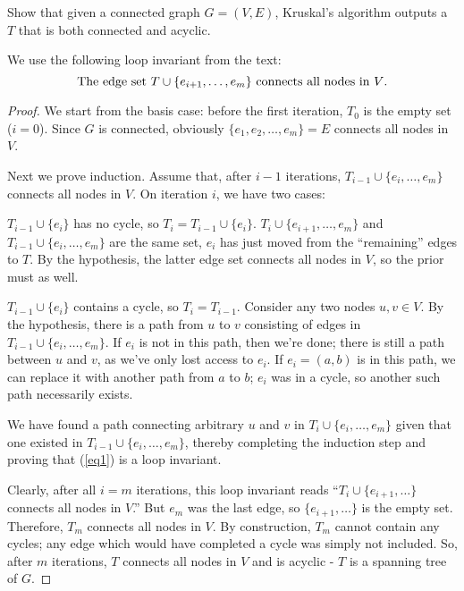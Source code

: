 \documentclass{article}
\newenvironment{prb}[1]
	{\renewcommand\theinner{#1}\inner}
	{\endinner}
\begin{document}
\begin{prb}{2.8}
	Show that given a connected graph $G=(V,E)$, Kruskal's algorithm outputs a
	$T$ that is both connected and acyclic.
\end{prb}

\break
We use the following loop invariant from the text:
\begin{equation}\label{eq1}
\textit{\emph{The edge set $T\cup\{e_{i+1},\ldots,e_m\}$ connects all
nodes in $V$.}}
\end{equation}

\begin{proof}
We start from the basis case: before the first iteration, $T_0$ is
the empty set ($i=0$). Since $G$ is connected, obviously 
$\{e_1,e_2,\ldots,e_m\}=E$ connects all nodes in $V$.

Next we prove induction. Assume that, after $i-1$ iterations,
$T_{i-1}\cup\{e_i,\ldots,e_m\}$ connects all nodes in $V$. On iteration
$i$, we have two cases:

 $T_{i-1}\cup\{e_i\}$ has no cycle, so 
$T_i=T_{i-1}\cup\{e_i\}$. $T_i\cup\{e_{i+1},\ldots,e_m\}$ and 
$T_{i-1}\cup\{e_i,\ldots,e_m\}$ are the same set, $e_i$ has just
moved from the ``remaining'' edges to $T$. By the hypothesis, the 
latter edge set connects all nodes in $V$, so the prior must as well.

 $T_{i-1}\cup\{e_i\}$ contains a cycle, so
$T_i=T_{i-1}$. Consider any two nodes $u,v\in V$. By the hypothesis,
there is a path from $u$ to $v$ consisting of edges in 
$T_{i-1}\cup\{e_i,\ldots,e_m\}$. If $e_i$ is not in this path,
then we're done; there is still a path between $u$ and $v$, as 
we've only lost access to $e_i$. If $e_i=(a,b)$ is in this path, we
can replace it with another path from $a$ to $b$; $e_i$ was in a cycle,
so another such path necessarily exists. 

We have found a path connecting arbitrary $u$ and $v$ in 
$T_i\cup\{e_i,\ldots,e_m\}$ given that one existed in 
$T_{i-1}\cup\{e_i,\ldots,e_m\}$, thereby completing the induction step
and proving that (\ref{eq1}) is a loop invariant.

Clearly, after all $i=m$ iterations, this loop invariant reads
``$T_i\cup\{e_{i+1},\ldots\}$ connects all nodes in $V$.'' But
$e_m$ was the last edge, so $\{e_{i+1},\ldots\}$ is the empty set.
Therefore, $T_m$ connects all nodes in $V$. By construction, 
$T_m$ cannot contain any cycles; any edge which would
have completed a cycle was simply not included. So, after $m$ iterations,
$T$ connects all nodes in $V$ and is acyclic - 
$T$ is a spanning tree of $G$.\qedhere 
\end{proof}
\end{document}
